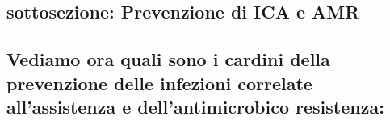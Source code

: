 \documentclass[]{article}
\begin{document}
\subsection{}\label{section}

\subsection{}\label{section-1}

\subsection{}\label{section-2}

\subsection{}\label{section-3}

\subsection{sottosezione: Prevenzione di ICA e
AMR}\label{sottosezione-prevenzione-di-ica-e-amr}

\subsection{}\label{section-4}

\subsection{Vediamo ora quali sono i cardini della prevenzione delle
infezioni correlate all'assistenza e dell'antimicrobico
resistenza:}\label{vediamo-ora-quali-sono-i-cardini-della-prevenzione-delle-infezioni-correlate-allassistenza-e-dellantimicrobico-resistenza}
\end{document}
